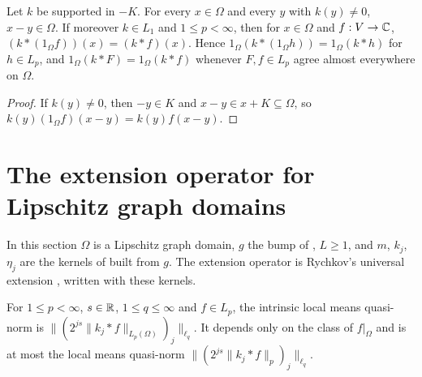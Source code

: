\begin{lemma}
\label{lem:support-principle}
\leanok
{}
Let $k$ be supported in $-K$. For every $x \in \Omega$ and every $y$ with $k(y) \neq 0$,
$x - y \in \Omega$. If moreover $k \in L_1$ and $1 \leq p < \infty$, then for $x \in \Omega$ and
$f : V \to \mathbb{C}$, $(k * (1_\Omega f))(x) = (k * f)(x)$. Hence
$1_\Omega (k * (1_\Omega h)) = 1_\Omega (k * h)$ for $h \in L_p$, and
$1_\Omega (k * F) = 1_\Omega (k * f)$ whenever $F, f \in L_p$ agree almost everywhere on
$\Omega$.
\end{lemma}

\begin{proof}
\leanok
If $k(y) \neq 0$, then $-y \in K$ and $x - y \in x + K \subseteq \Omega$, so
$k(y) (1_\Omega f)(x - y) = k(y) f(x - y)$.
\end{proof}

\section{The extension operator for Lipschitz graph domains}

In this section $\Omega$ is a Lipschitz graph domain, $g$ the bump of ,
$L \geq 1$, and $m$, $k_j$, $\eta_j$ are the kernels of  built from $g$.
The extension operator is Rychkov's universal extension \cite{Rychkov}, written with these
kernels.

\begin{definition}
\label{def:intrinsic-local-means}
\leanok
{}
For $1 \leq p < \infty$, $s \in \mathbb{R}$, $1 \leq q \leq \infty$ and $f \in L_p$, the intrinsic local
means quasi-norm is $\|(2^{js} \|k_j * f\|_{L_p(\Omega)})_j\|_{\ell_q}$. It depends only on the
class of $f|_\Omega$ and is at most the local means quasi-norm
$\|(2^{js} \|k_j * f\|_p)_j\|_{\ell_q}$.
\end{definition}

